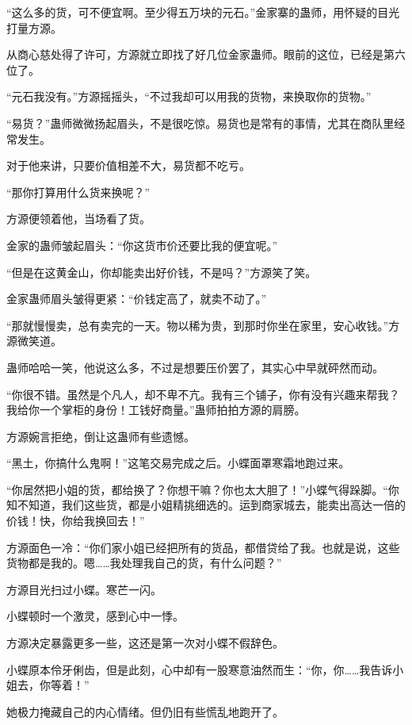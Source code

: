 
\begin{this_body}

“这么多的货，可不便宜啊。至少得五万块的元石。”金家寨的蛊师，用怀疑的目光打量方源。

从商心慈处得了许可，方源就立即找了好几位金家蛊师。眼前的这位，已经是第六位了。

“元石我没有。”方源摇摇头，“不过我却可以用我的货物，来换取你的货物。”

“易货？”蛊师微微扬起眉头，不是很吃惊。易货也是常有的事情，尤其在商队里经常发生。

对于他来讲，只要价值相差不大，易货都不吃亏。

“那你打算用什么货来换呢？”

方源便领着他，当场看了货。

金家的蛊师皱起眉头：“你这货市价还要比我的便宜呢。”

“但是在这黄金山，你却能卖出好价钱，不是吗？”方源笑了笑。

金家蛊师眉头皱得更紧：“价钱定高了，就卖不动了。”

“那就慢慢卖，总有卖完的一天。物以稀为贵，到那时你坐在家里，安心收钱。”方源微笑道。

蛊师哈哈一笑，他说这么多，不过是想要压价罢了，其实心中早就砰然而动。

“你很不错。虽然是个凡人，却不卑不亢。我有三个铺子，你有没有兴趣来帮我？我给你一个掌柜的身份！工钱好商量。”蛊师拍拍方源的肩膀。

方源婉言拒绝，倒让这蛊师有些遗憾。

“黑土，你搞什么鬼啊！”这笔交易完成之后。小蝶面罩寒霜地跑过来。

“你居然把小姐的货，都给换了？你想干嘛？你也太大胆了！”小蝶气得跺脚。“你知不知道，我们这些货，都是小姐精挑细选的。运到商家城去，能卖出高达一倍的价钱！快，你给我换回去！”

方源面色一冷：“你们家小姐已经把所有的货品，都借贷给了我。也就是说，这些货物都是我的。嗯……我处理我自己的货，有什么问题？”

方源目光扫过小蝶。寒芒一闪。

小蝶顿时一个激灵，感到心中一悸。

方源决定暴露更多一些，这还是第一次对小蝶不假辞色。

小蝶原本伶牙俐齿，但是此刻，心中却有一股寒意油然而生：“你，你……我告诉小姐去，你等着！”

她极力掩藏自己的内心情绪。但仍旧有些慌乱地跑开了。


\end{this_body}
